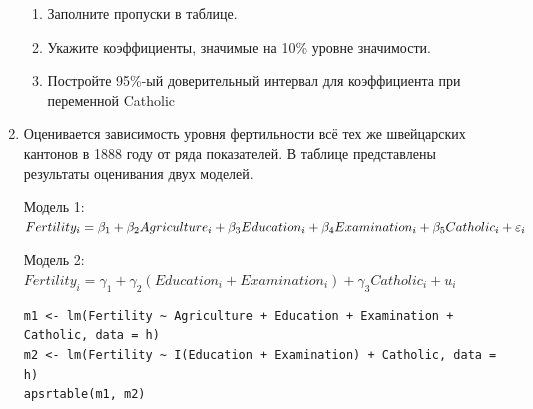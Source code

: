 \documentclass[12pt, a4paper]{article}
\begin{document}
\begin{enumerate}
\begin{enumerate}
\item Заполните пропуски в таблице.
\item Укажите коэффициенты, значимые на 10\% уровне значимости.
\item Постройте 95\%-ый доверительный интервал для коэффициента при переменной Catholic
\end{enumerate}


\item Оценивается зависимость уровня фертильности всё тех же швейцарских кантонов в 1888 году от ряда показателей. В таблице представлены результаты оценивания двух моделей.

Модель 1: $Fertility_i=\beta_1+\beta_2 Agriculture_i+\beta_3 Education_i+\beta_4 Examination_i+\beta_5 Catholic_i+\varepsilon_i$

Модель 2: $Fertility_i=\gamma_1+\gamma_2 (Education_i+Examination_i)+\gamma_3 Catholic_i+u_i$

\begin{verbatim}
m1 <- lm(Fertility ~ Agriculture + Education + Examination + Catholic, data = h)
m2 <- lm(Fertility ~ I(Education + Examination) + Catholic, data = h)
apsrtable(m1, m2)
\end{verbatim}


\end{enumerate}
\end{document}
